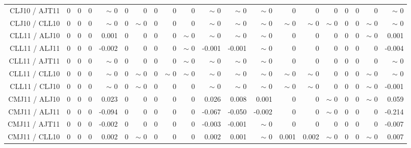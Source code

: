 \begin{table}[H]
\begin{center}
\begin{tabular}{|r|rrrrrrrrrrrrrrrrrr|r|}
CLJ10 / AJT11 &  0 &  0 &  0 &  {\tiny $\sim$ }0 &  0 &  0 &  0 &  0 &  0 &  {\tiny $\sim$ }0 &  {\tiny $\sim$ }0 &  {\tiny $\sim$ }0 &  0 &  0 &  0 &  0 &  0 &  0 &  {\tiny $\sim$ }0 \\
CLJ10 / CLL10 &  0 &  0 &  0 &  {\tiny $\sim$ }0 &  0 &  {\tiny $\sim$ }0 &  0 &  0 &  0 &  {\tiny $\sim$ }0 &  {\tiny $\sim$ }0 &  {\tiny $\sim$ }0 &  {\tiny $\sim$ }0 &  {\tiny $\sim$ }0 &  {\tiny $\sim$ }0 &  0 &  0 &  {\tiny $\sim$ }0 &  {\tiny $\sim$ }0 \\
CLL11 / ALJ10 &  0 &  0 &  0 &      0.001 &  0 &  0 &  0 &  0 &  {\tiny $\sim$ }0 &  {\tiny $\sim$ }0 &  {\tiny $\sim$ }0 &  {\tiny $\sim$ }0 &  0 &  0 &  0 &  0 &  0 &  {\tiny $\sim$ }0 &      0.001 \\
CLL11 / ALJ11 &  0 &  0 &  0 &     -0.002 &  0 &  0 &  0 &  0 &  {\tiny $\sim$ }0 &     -0.001 &     -0.001 &  {\tiny $\sim$ }0 &  0 &  0 &  0 &  0 &  0 &  0 &     -0.004 \\
CLL11 / AJT11 &  0 &  0 &  0 &  {\tiny $\sim$ }0 &  0 &  0 &  0 &  0 &  {\tiny $\sim$ }0 &  {\tiny $\sim$ }0 &  {\tiny $\sim$ }0 &  {\tiny $\sim$ }0 &  0 &  0 &  0 &  0 &  0 &  0 &  {\tiny $\sim$ }0 \\
CLL11 / CLL10 &  0 &  0 &  0 &  {\tiny $\sim$ }0 &  0 &  {\tiny $\sim$ }0 &  0 &  {\tiny $\sim$ }0 &  {\tiny $\sim$ }0 &  {\tiny $\sim$ }0 &  {\tiny $\sim$ }0 &  {\tiny $\sim$ }0 &  {\tiny $\sim$ }0 &  {\tiny $\sim$ }0 &  0 &  0 &  0 &  {\tiny $\sim$ }0 &  {\tiny $\sim$ }0 \\
CLL11 / CLJ10 &  0 &  0 &  0 &  {\tiny $\sim$ }0 &  0 &  {\tiny $\sim$ }0 &  0 &  0 &  0 &  {\tiny $\sim$ }0 &  {\tiny $\sim$ }0 &  {\tiny $\sim$ }0 &  {\tiny $\sim$ }0 &  {\tiny $\sim$ }0 &  0 &  0 &  0 &  {\tiny $\sim$ }0 &     -0.001 \\
CMJ11 / ALJ10 &  0 &  0 &  0 &      0.023 &  0 &  0 &  0 &  0 &  0 &      0.026 &      0.008 &      0.001 &  0 &  0 &  {\tiny $\sim$ }0 &  0 &  0 &  {\tiny $\sim$ }0 &  \colorbox{Yellow1}{    0.059} \\
CMJ11 / ALJ11 &  0 &  0 &  0 &     -0.094 &  0 &  0 &  0 &  0 &  0 &     -0.067 &     -0.050 &     -0.002 &  0 &  0 &  {\tiny $\sim$ }0 &  0 &  0 &  0 &     -0.214 \\
CMJ11 / AJT11 &  0 &  0 &  0 &     -0.002 &  0 &  0 &  0 &  0 &  0 &     -0.003 &     -0.001 &  {\tiny $\sim$ }0 &  0 &  0 &  0 &  0 &  0 &  0 &     -0.007 \\
CMJ11 / CLL10 &  0 &  0 &  0 &      0.002 &  0 &  {\tiny $\sim$ }0 &  0 &  0 &  0 &      0.002 &      0.001 &  {\tiny $\sim$ }0 &      0.001 &      0.002 &  {\tiny $\sim$ }0 &  0 &  0 &  {\tiny $\sim$ }0 &      0.007 \\

\end{tabular}
\end{center}
\end{table}
